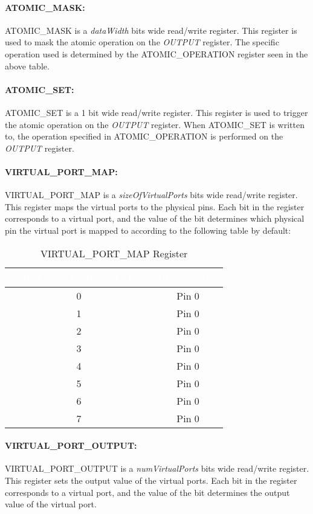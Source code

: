 \paragraph{ATOMIC\_MASK:}
ATOMIC\_MASK is a \textit{dataWidth} bits wide read/write register. This register is used to mask the atomic operation on the \textit{OUTPUT} register. 
The specific operation used is determined by the ATOMIC\_OPERATION register seen in the above table.

\paragraph{ATOMIC\_SET:}
ATOMIC\_SET is a 1 bit wide read/write register. This register is used to trigger the atomic operation on the \textit{OUTPUT} register. 
When ATOMIC\_SET is written to, the operation specified in ATOMIC\_OPERATION is performed on the \textit{OUTPUT} register.

\paragraph{VIRTUAL\_PORT\_MAP:}
VIRTUAL\_PORT\_MAP is a \textit{sizeOfVirtualPorts} bits wide read/write register. This register maps the virtual ports to the physical pins.
Each bit in the register corresponds to a virtual port, and the value of the bit determines which physical pin the virtual port is mapped to 
according to the following table by default:
\begin{table}[h]
  \centering
  \begin{tabular}{|c|c|}
      \hline
      \rowcolor{dark-gray}  %
      \textcolor{white}{\textbf{VIRTUAL\_PORT\_MAP[n]}} & \textcolor{white}{\textbf{Physical Pin}} \\ \hline
      0 & Pin 0 \\ \hline
      1 & Pin 0 \\ \hline
      2 & Pin 0 \\ \hline
      3 & Pin 0 \\ \hline
      4 & Pin 0 \\ \hline
      5 & Pin 0 \\ \hline
      6 & Pin 0 \\ \hline
      7 & Pin 0 \\ \hline
  \end{tabular}
  \caption{VIRTUAL\_PORT\_MAP Register}
\end{table}

\paragraph{VIRTUAL\_PORT\_OUTPUT:}
VIRTUAL\_PORT\_OUTPUT is a \textit{numVirtualPorts} bits wide read/write register. This register sets the output value of the virtual ports.
Each bit in the register corresponds to a virtual port, and the value of the bit determines the output value of the virtual port.

